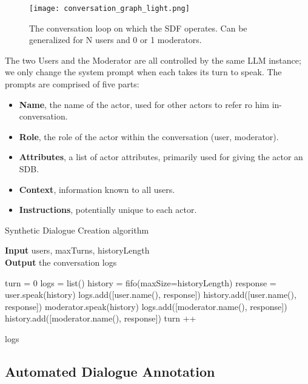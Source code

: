 \begin{figure}
	\centering
	\texttt{[image: conversation\_graph\_light.png]}
	\caption{The conversation loop on which the SDF operates. Can be generalized for N users and 0 or 1 moderators.}
	\label{fig::conversation}
\end{figure}

The two Users and the Moderator are all controlled by the same LLM instance; we only change the system prompt when each takes its turn to speak. The prompts are comprised of five parts:

\begin{itemize}
	\item \textbf{Name}, the name of the actor, used for other actors to refer ro him in-conversation.
	\item \textbf{Role}, the role of the actor within the conversation (user, moderator).
	\item \textbf{Attributes}, a list of actor attributes, primarily used for giving the actor an SDB.
	\item \textbf{Context}, information known to all users.
	\item \textbf{Instructions}, potentially unique to each actor. 
\end{itemize}


\begin{algorithm}
	\caption{Synthetic Dialogue Creation algorithm} 
	\label{al::dialogue-creation}
	\hspace*{\algorithmicindent} \textbf{Input} users, maxTurns, historyLength\\
	\hspace*{\algorithmicindent} \textbf{Output} the conversation logs
	\begin{algorithmic}[1]	
		\State turn = 0
		\State logs = list()
		\State history = fifo(maxSize=historyLength)
		\State 
				\State response = user.speak(history)
				\State logs.add([user.name(), response])
				\State history.add([user.name(), response])
				\State
				\State moderator.speak(history)
				\State logs.add([moderator.name(), response])
				\State history.add([moderator.name(), response])
			\EndFor
			\State turn ++
		\EndWhile
		
		\State \Return logs
		
	\end{algorithmic} 
\end{algorithm}



\subsection{Automated Dialogue Annotation}
\label{ssec:system:annotation}

